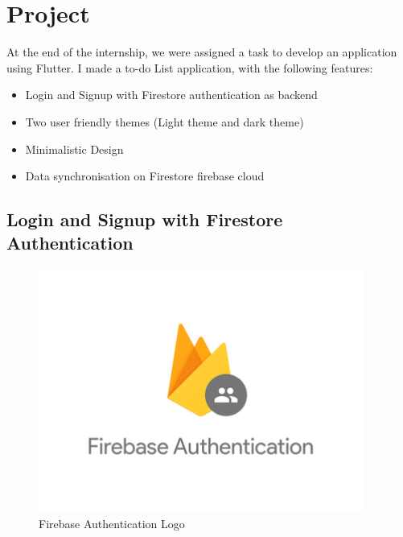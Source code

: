 \chapter{Project}
At the end of the internship, we were assigned a task to develop an application using Flutter. I made a to-do List application, with the following features:\\
\begin{itemize}
\item Login and Signup with Firestore authentication as backend
\item Two user friendly themes (Light theme and dark theme)
\item Minimalistic Design
\item Data synchronisation on Firestore firebase cloud
\end{itemize}
\hfill
\newpage

\section{Login and Signup with Firestore Authentication}

\begin{figure}
  \begin{center}
  \includegraphics[height=80mm]{Images & Logos/CH_08_FirebaseAuth.png}
  \end{center}
  \caption{Firebase Authentication Logo}
\end{figure}

